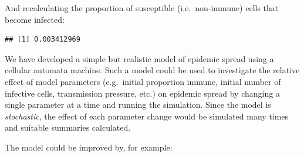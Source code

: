 \documentclass[12pt,a4paper]{book}
\newenvironment{Shaded}{\begin{snugshade}}{\end{snugshade}}
\newcommand{\KeywordTok}[1]{\textcolor[rgb]{0.13,0.29,0.53}{\textbf{#1}}}
\newcommand{\NormalTok}[1]{#1}
\newcommand{\OperatorTok}[1]{\textcolor[rgb]{0.81,0.36,0.00}{\textbf{#1}}}
\newcommand{\StringTok}[1]{\textcolor[rgb]{0.31,0.60,0.02}{#1}}
\theoremstyle{definition}
\theoremstyle{definition}
\theoremstyle{definition}
\theoremstyle{remark}
\begin{document}
And recalculating the proportion of susceptible (i.e.~non-immune) cells
that become infected:

\begin{Shaded}
\end{Shaded}

\begin{verbatim}
## [1] 0.003412969
\end{verbatim}

We have developed a simple but realistic model of epidemic spread using
a cellular automata machine. Such a model could be used to investigate
the relative effect of model parameters (e.g.~initial proportion immune,
initial number of infective cells, transmission pressure, etc.) on
epidemic spread by changing a single parameter at a time and running the
simulation. Since the model is \emph{stochastic}, the effect of each
parameter change would be simulated many times and suitable summaries
calculated.

The model could be improved by, for example:
\end{document}
